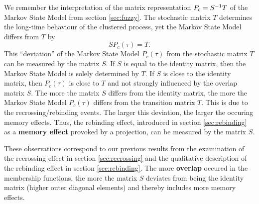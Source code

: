 We remember the interpretation of the matrix representation $P_c = S^{-1} T$ of the Markov State Model from section \ref{sec:fuzzy}.
The stochastic matrix $T$ determines the long-time behaviour of the clustered process, yet the Markov State Model differs from $T$ by
\begin{equation*}
S P_c(\tau) = T.
\end{equation*}
This ``deviation'' of the Markov State Model $P_c(\tau)$ from the stochastic matrix $T$ can be measured by the matrix $S$.
If $S$ is equal to the identity matrix, then the Markov State Model is solely determined by $T$.
If $S$ is close to the identity matrix, then $P_c(\tau)$ is close to $T$ and not strongly influenced by the overlap matrix $S$.
The more the matrix $S$ differs from the identity matrix, the more the Markov State Model $P_c(\tau)$ differs from the transition matrix $T$.
This is due to the recrossing/rebinding events.
The larger this deviation, the larger the occuring memory effects.
Thus, the rebinding effect, introduced in section \ref{sec:rebinding} as a \textbf{memory effect} provoked by a projection, can be measured by the matrix $S$.

These observations correspond to our previous results from the examination of the recrossing effect in section \ref{sec:recrossing} and the qualitative description of the rebinding effect in section \ref{sec:rebinding}. 
The more \textbf{overlap} occured in the membership functions, the more the matrix $S$ deviates from being the identity matrix (higher outer diagonal elements) and thereby includes more memory effects.

